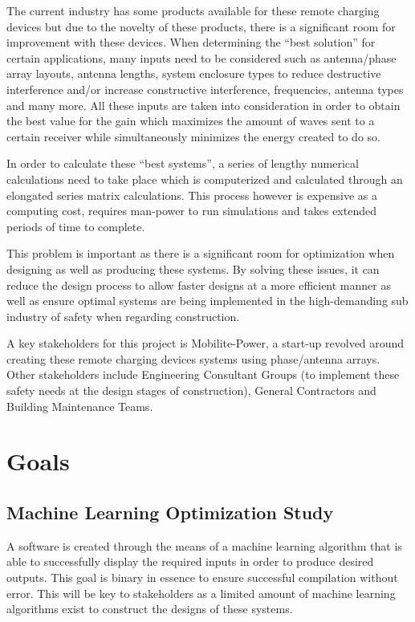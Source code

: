 \documentclass[12pt,a4]{report}
\begin{document}
The current industry has some products available for these remote charging devices but due to the novelty of these products, there is a significant room for improvement with these devices. When determining the “best solution” for certain applications, many inputs need to be considered such as antenna/phase array layouts, antenna lengths, system enclosure types to reduce destructive interference and/or increase constructive interference, frequencies, antenna types and many more. All these inputs are taken into consideration in order to obtain the best value for the gain which maximizes the amount of waves sent to a certain receiver while simultaneously minimizes the energy created to do so. 

In order to calculate these “best systems”, a series of lengthy numerical calculations need to take place which is computerized and calculated through an elongated series matrix calculations. This process however is expensive as a computing cost, requires man-power to run simulations and takes extended periods of time to complete.  

This problem is important as there is a significant room for optimization when designing as well as producing these systems. By solving these issues, it can reduce the design process to allow faster designs at a more efficient manner as well as ensure optimal systems are being implemented in the high-demanding sub industry of safety when regarding construction. 

A key stakeholders for this project is Mobilite-Power, a start-up revolved around creating these remote charging devices systems using phase/antenna arrays. Other stakeholders include Engineering Consultant Groups (to implement these safety needs at the design stages of construction), General Contractors and Building Maintenance Teams. 

\section*{Goals}
\subsection*{Machine Learning Optimization Study}
A software is created through the means of a machine learning algorithm that is able to successfully display the required inputs in order to produce desired outputs. This goal is binary in essence to ensure successful compilation without error. This will be key to stakeholders as a limited amount of machine learning algorithms exist to construct the designs of these systems. 
\end{document}

